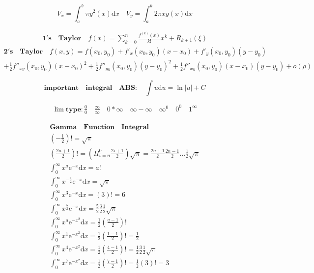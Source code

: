 \documentclass{article}
\begin{document}
\begin{displaymath} 
    V_{x} = \int_{a}^{b} \pi y^2(x)\mathrm{d}x \quad V_{y}= \int_{a}^{b}2\pi xy(x)\mathrm{d}x  
\end{displaymath}

\begin{align*} 
    \bm{1's \quad Taylor} \quad f(x) = \sum_{k=0}^{n}\frac{f^{(k)}(x)}{k!}x^{k} + R_{k+1}(\xi)
\end{align*}
\begin{align*} 
    \bm{2's \quad Taylor} \quad f(x,y) = f(x_{0},y_{0})+ f'_{x}(x_{0},y_{0})(x-x_{0}) + f'_{y}(x_{0},y_{0})(y-y_{0}) 
    \\ + \frac{1}{2}f''_{xy}(x_{0},y_{0})(x-x_{0})^2 + \frac{1}{2}f''_{yy}(x_{0},y_{0})(y-y_{0})^2 + \frac{1}{2}f''_{xy}(x_{0},y_{0})(x-x_{0})(y-y_{0}) + o(\rho) 
\end{align*}

\begin{displaymath} 
    \bm{important \quad integral \quad ABS }: \quad \int u \mathrm{d}u = \ln|u| + C 
\end{displaymath}

\begin{align*}
    \lim \bm{type} : \frac{0}{0} \quad \frac{\infty}{\infty} \quad 0 * \infty \quad \infty - \infty \quad \infty^{0} \quad 0^0 \quad 1^{\infty}
\end{align*}


\clearpage 

\begin{align*}
    \bm{Gamma \quad Function \quad Integral} \\ 
    \left(-\frac{1}{2}\right)! = \sqrt{\pi} \\ 
    \left(\frac{2n+1}{2}\right)! = \left(\Pi_{i=n}^{0}{\frac{2i+1}{2}}\right)\sqrt{\pi} = \frac{2n+1}{2}\frac{2n-1}{2}\dots\frac{1}{2}\sqrt{\pi} \\ 
    \int_{0}^{\infty} x^{a}\mathrm{e}^{-x}\mathrm{d}x = a! \\
    \int_{0}^{\infty} x^{-\frac{1}{2}}\mathrm{e}^{-x}\mathrm{d}x = \sqrt{\pi}\\ 
    \int_{0}^{\infty} x^{3}\mathrm{e}^{-x}\mathrm{d}x = (3)! = 6 \\ 
    \int_{0}^{\infty} x^{\frac{5}{2}}\mathrm{e}^{-x}\mathrm{d}x = \frac{5}{2}\frac{3}{2}\frac{1}{2}\sqrt{\pi}\\  
    \int_{0}^{\infty} x^{a}\mathrm{e}^{-x^2}\mathrm{d}x = \frac{1}{2} \left(\frac{a-1}{2}\right)! \\ 
    \int_{0}^{\infty} x^{1}\mathrm{e}^{-x^2}\mathrm{d}x = \frac{1}{2} \left(\frac{1-1}{2}\right)! = \frac{1}{2} \\
    \int_{0}^{\infty} x^{4}\mathrm{e}^{-x^2}\mathrm{d}x = \frac{1}{2} \left(\frac{4-1}{2}\right)! = \frac{1}{2}\frac{3}{2}\frac{1}{2}\sqrt{\pi}\\ 
    \int_{0}^{\infty} x^{7}\mathrm{e}^{-x^2}\mathrm{d}x = \frac{1}{2} \left(\frac{7-1}{2}\right)! = \frac{1}{2}(3)! = 3\\
\end{align*}
\end{document}
